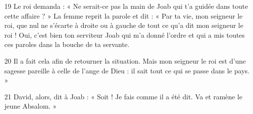 
19 Le roi demanda : « Ne serait-ce pas la main de Joab qui t’a guidée dans toute cette affaire ? » La femme reprit la parole et dit : « Par ta vie, mon seigneur le roi, que nul ne s’écarte à droite ou à gauche de tout ce qu’a dit mon seigneur le roi ! Oui, c’est bien ton serviteur Joab qui m’a donné l’ordre et qui a mis toutes ces paroles dans la bouche de ta servante.

20 Il a fait cela afin de retourner la situation. Mais mon seigneur le roi est d’une sagesse pareille à celle de l’ange de Dieu : il sait tout ce qui se passe dans le pays. »

21 David, alors, dit à Joab : « Soit ! Je fais comme il a été dit. Va et ramène le jeune Absalom. »